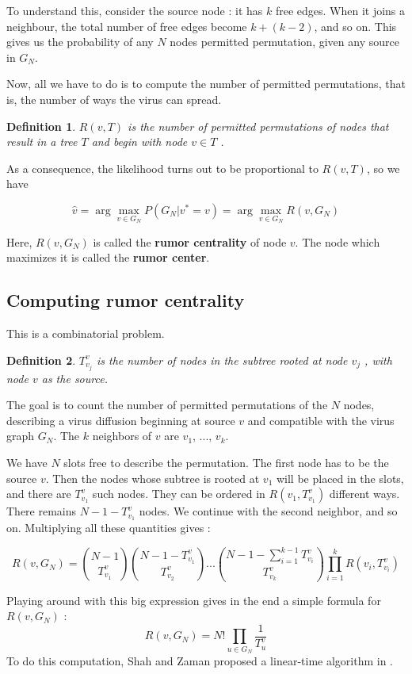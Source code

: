 \documentclass[10pt,a4paper]{article}
\newtheorem{definition}{Definition}
\begin{document}
To understand this, consider the source node : it has $k$ free edges. When it joins a neighbour, the total number of free edges become $k+(k-2)$, and so on. This gives us the probability of any $N$ nodes permitted permutation, given any source in $G_N$.

Now, all we have to do is to compute the number of permitted permutations, that is, the number of ways the virus can spread.

\begin{definition}
$R(v,T )$ is the number of permitted permutations of nodes that result in a tree $T$ and begin with node
$v \in T$ .
\end{definition}

As a consequence, the likelihood turns out to be proportional to $R(v,T)$, so we have

\[ \hat{v} = \arg \max_{v \in G_N} P(G_{N} | v^{*} = v) = \arg \max_{v \in G_N} R(v, G_N) \]

Here, $R(v,G_N)$ is called the \textbf{rumor centrality} of node $v$. The node which maximizes it is called the \textbf{rumor center}.

\subsection{Computing rumor centrality}
This is a combinatorial problem.
\begin{definition}
$T^{v}_{v_j}$ is the number of nodes in the subtree
rooted at node $v_j$ , with node $v$ as the source.
\end{definition}

The goal is to count the number of permitted permutations of the $N$ nodes, describing a virus diffusion beginning at source $v$ and compatible with the virus graph $G_N$. The $k$ neighbors of $v$ are $v_1$, ..., $v_k$.

We have $N$ slots free to describe the permutation. The first node has to be the source $v$. Then the nodes whose subtree is rooted at $v_1$ will be placed in the slots, and there are $T^{v}_{v_1}$ such nodes. They can be ordered in $R(v_1,T^{v}_{v_1})$ different ways. There remains $N-1-T^{v}_{v_1}$ nodes. We continue with the second neighbor, and so on. Multiplying all these quantities gives :

\[ 
R(v, G_N) = \binom{N-1}{T^{v}_{v_1}} \binom{N-1-T^{v}_{v_1}}{T^{v}_{v_2}} ... 
\binom{N-1-\sum_{i=1}^{k-1} T^{v}_{v_i}}{T^{v}_{v_k}}
\prod_{i=1}^{k} R(v_i, T^{v}_{v_i})
\]

Playing around with this big expression gives in the end a simple formula for $R(v, G_N)$ :
\[
R(v, G_N) = N! \prod_{u \in G_N} \frac{1}{T^{v}_{u}}
\]
To do this computation, Shah and Zaman proposed a linear-time algorithm in \cite{shah1}.
\end{document}
